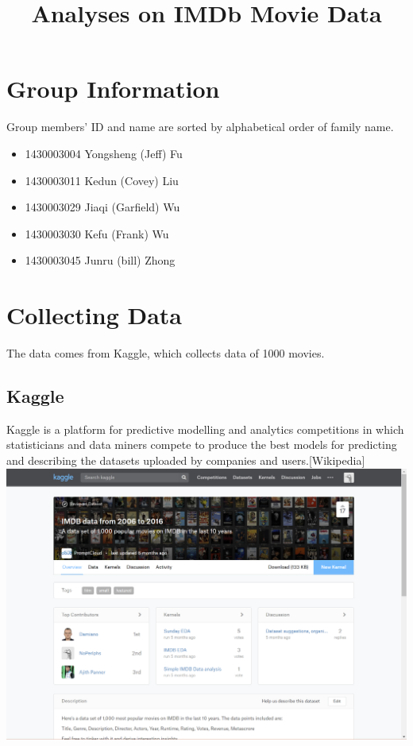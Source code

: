 \documentclass[11pt]{article}
\title{Analyses on IMDb Movie Data}
\makeatletter
\def\maxwidth{\ifdim\Gin@nat@width>\linewidth\linewidth
    \else\Gin@nat@width\fi}
\let\Oldincludegraphics\includegraphics
\renewcommand{\includegraphics}[1]{\Oldincludegraphics[width=.8\maxwidth]{#1}}
\providecommand{\tightlist}{%
      \setlength{\itemsep}{0pt}\setlength{\parskip}{0pt}}
\makeatother
\begin{document}
    
    
    \maketitle

    \tableofcontents
    

\section{Group Information}\label{group-information}
Group members' ID and name are sorted by alphabetical order of family name.
\begin{itemize}
\tightlist
\item
  1430003004 Yongsheng (Jeff) Fu
\item
  1430003011 Kedun (Covey) Liu
\item
  1430003029 Jiaqi (Garfield) Wu
\item
  1430003030 Kefu (Frank) Wu
\item
  1430003045 Junru (bill) Zhong
\end{itemize}
  \section{Collecting Data} 
  The data comes from Kaggle, which collects data of 1000 movies. 
  \subsection{Kaggle}
  Kaggle is a
  platform for predictive modelling and analytics competitions in which
  statisticians and data miners compete to produce the best models for
  predicting and describing the datasets uploaded by companies and
  users.{[}Wikipedia{]} \includegraphics{kaggle-data.png}
\end{document}
